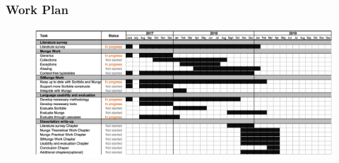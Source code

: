 \label{figures2}
\begin{frame}\frametitle{Work Plan}
  \begin{figure}[htb]
    \includegraphics[scale=0.30]{slides/workplan.png}
  \end{figure}
\end{frame}
